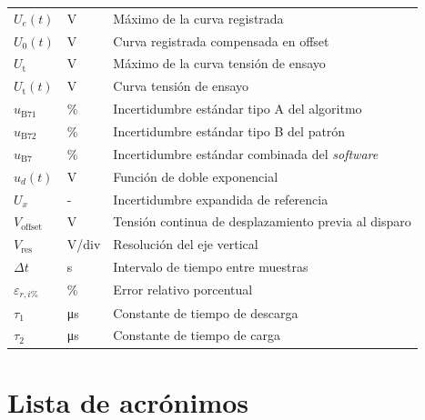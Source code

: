 \begin{xltabular}{\linewidth}{llX}
    $U_e(t)$ & \unit{\volt} & Máximo de la curva registrada\\
    $U_0(t)$ & \unit{\volt} & Curva registrada compensada en offset\\
    $U_\text{t}$ & \unit{\volt} & Máximo de la curva tensión de ensayo\\
    $U_\text{t}(t)$ & \unit{\volt} & Curva tensión de ensayo\\
    $u_{\text{B}71}$ & \% & Incertidumbre estándar tipo A del algoritmo\\
    $u_{\text{B}72}$ & \% & Incertidumbre estándar tipo B del patrón\\
    $u_{\text{B}7}$ & \% & Incertidumbre estándar combinada del \textit{software}\\
    $u_d(t)$ & \unit{\volt} & Función de doble exponencial\\
    $U_x$ & - & Incertidumbre expandida de referencia\\
    $V_{\text{offset}}$ & \unit{\volt} & Tensión continua de desplazamiento previa al disparo\\
    $V_{\text{res}}$ & \unit{\volt}/div & Resolución del eje vertical\\
    $\Delta t$ & \unit{\second} & Intervalo de tiempo entre muestras\\
    $\varepsilon_{r,i\%}$ & \unit{\percent} & Error relativo porcentual\\
    $\tau_1$ & \unit{\micro\second} & Constante de tiempo de descarga\\
    $\tau_2$ & \unit{\micro\second} & Constante de tiempo de carga\\
\end{xltabular}

\section*{Lista de acrónimos}

